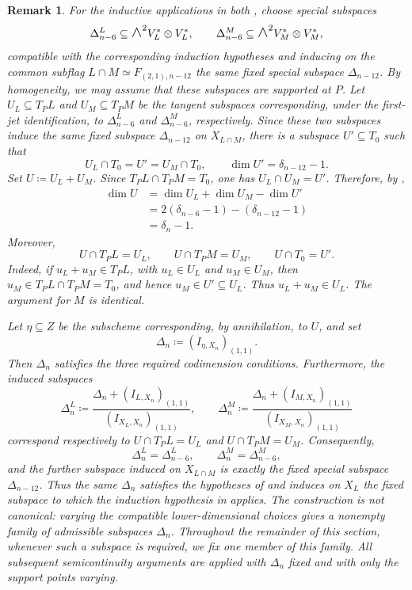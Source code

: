 \documentclass[a4paper,reqno]{amsart}
\theoremstyle{plainnopunct}
\theoremstyle{definitionnopunct}
\newtheorem{remark}[remark]{Remark}
\newcommand{\superwedge}{\mathlarger{\mathlarger{\wedge}}}
\begin{document}
\begin{remark}
For the inductive applications in both ,
choose special subspaces
\[
\Delta_{n-6}^{L}
\subseteq
\superwedge^2V_L^*\otimes V_L^*,
\qquad
\Delta_{n-6}^{M}
\subseteq
\superwedge^2V_M^*\otimes V_M^*,
\]
compatible with the corresponding induction hypotheses and
inducing on the common subflag
$L\cap M\simeq F_{(2,1),n-12}$ the same fixed special subspace
$\Delta_{n-12}$. By homogeneity, we may assume that these subspaces
are supported at $P$. Let
$U_L\subseteq T_PL$ and $U_M\subseteq T_PM$
be the tangent subspaces corresponding, under the first-jet
identification, to $\Delta_{n-6}^{L}$ and
$\Delta_{n-6}^{M}$, respectively. Since these two subspaces induce
the same fixed subspace $\Delta_{n-12}$ on $X_{L\cap M}$, there is a
subspace $U'\subseteq T_0$ such that
\[
U_L\cap T_0
=
U'
=
U_M\cap T_0,
\qquad
\dim U'
=
\delta_{n-12}-1.
\]
Set $U
\coloneq
U_L+U_M$.
Since
$ T_PL\cap T_PM=T_0$, one has
$U_L\cap U_M=U'$. Therefore, by ,
\[
\begin{aligned}
\dim U
&=
\dim U_L+\dim U_M-\dim U'
\\
&=
2(\delta_{n-6}-1)-(\delta_{n-12}-1)
\\
&=
\delta_n-1.
\end{aligned}
\]
Moreover,
\[
U\cap T_PL=U_L,
\qquad
U\cap T_PM=U_M,
\qquad
U\cap T_0=U'.
\]
Indeed, if $u_L+u_M\in T_PL$, with
$u_L\in U_L$ and $u_M\in U_M$, then $u_M\in
 T_PL\cap T_PM
=
T_0$,
and hence $u_M\in U'\subseteq U_L$. Thus
$u_L+u_M\in U_L$. The argument for $M$ is identical.

Let $\eta\subseteq Z$ be the subscheme corresponding, by
annihilation, to $U$, and set
\[
\Delta_n
\coloneq
\left(
I_{\eta,X_n}
\right)_{(1,1)}.
\]
Then $\Delta_n$ satisfies the three required codimension
conditions. Furthermore, the induced subspaces
\[
\Delta_n^{L}
\coloneq
\frac{
\Delta_n+(I_{L,X_n})_{(1,1)}
}{
(I_{X_L,X_n})_{(1,1)}
},
\qquad
\Delta_n^{M}
\coloneq
\frac{
\Delta_n+(I_{M,X_n})_{(1,1)}
}{
(I_{X_M,X_n})_{(1,1)}
}
\]
correspond respectively to
$U\cap T_PL=U_L$ and
$U\cap T_PM=U_M$. Consequently,
\[
\Delta_n^{L}
=
\Delta_{n-6}^{L},
\qquad
\Delta_n^{M}
=
\Delta_{n-6}^{M},
\]
and the further subspace induced on $X_{L\cap M}$ is exactly the
fixed special subspace $\Delta_{n-12}$.
Thus the same $\Delta_n$ satisfies the hypotheses of
 and induces on $X_L$ the fixed subspace to which the
induction hypothesis in  applies.
The construction is not canonical: varying the compatible
lower-dimensional choices gives a nonempty family of admissible
subspaces $\Delta_n$. Throughout the remainder of this section,
whenever such a subspace is required, we fix one member of this
family. All subsequent semicontinuity arguments are applied with
$\Delta_n$ fixed and with only the support points varying.
\end{remark}
\end{document}
